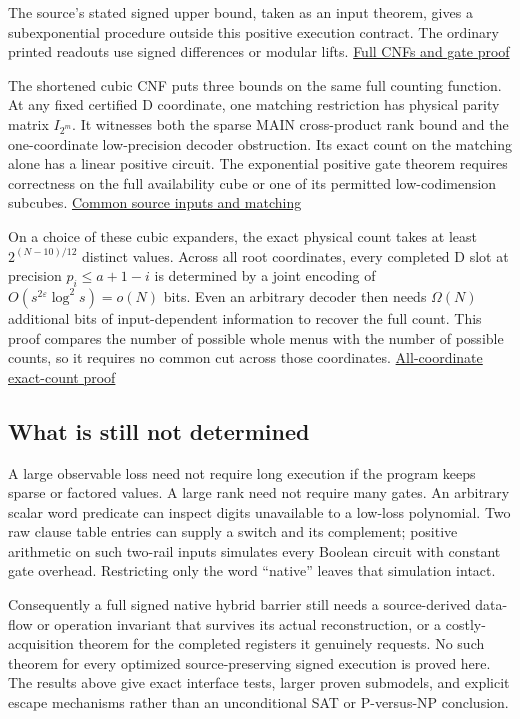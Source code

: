 \documentclass[11pt,a4paper]{article}
\begin{document}
The source's stated signed upper bound, taken as an input theorem, gives
a subexponential procedure outside this positive execution contract. The
ordinary printed readouts use signed differences or modular lifts.
\hyperref[v8-section-stronger-family]{Full CNFs and gate proof}

The shortened cubic CNF puts three bounds on the same full counting
function. At any fixed certified D coordinate, one matching restriction
has physical parity matrix \(I_{2^m}\). It witnesses both the sparse
MAIN cross-product rank bound and the one-coordinate low-precision
decoder obstruction. Its exact count on the matching alone has a linear
positive circuit. The exponential positive gate theorem requires
correctness on the full availability cube or one of its permitted
low-codimension subcubes. \hyperref[v8-section-common-native-family]{Common
source inputs and matching}

On a choice of these cubic expanders, the exact physical count takes at
least \(2^{(N-10)/12}\) distinct values. Across all root coordinates,
every completed D slot at precision \(p_i\le a+1-i\) is determined by a
joint encoding of \(O(s^{2\varepsilon}\log^2s)=o(N)\) bits. Even an
arbitrary decoder then needs \(\Omega(N)\) additional bits of
input-dependent information to recover the full count. This proof
compares the number of possible whole menus with the number of possible
counts, so it requires no common cut across those coordinates.
\hyperref[v8-section-pooled-menu-barrier]{All-coordinate exact-count proof}

\subsection{What is still not
determined}\label{v8-what-is-still-not-determined}

A large observable loss need not require long execution if the program
keeps sparse or factored values. A large rank need not require many
gates. An arbitrary scalar word predicate can inspect digits unavailable
to a low-loss polynomial. Two raw clause table entries can supply a
switch and its complement; positive arithmetic on such two-rail inputs
simulates every Boolean circuit with constant gate overhead. Restricting
only the word ``native'' leaves that simulation intact.

Consequently a full signed native hybrid barrier still needs a
source-derived data-flow or operation invariant that survives its actual
reconstruction, or a costly-acquisition theorem for the completed
registers it genuinely requests. No such theorem for every optimized
source-preserving signed execution is proved here. The results above
give exact interface tests, larger proven submodels, and explicit escape
mechanisms rather than an unconditional SAT or P-versus-NP conclusion.
\end{document}
